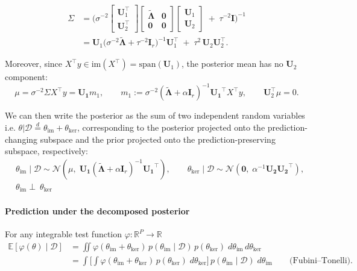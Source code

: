 \begin{align}
\Sigma
&=\Bigg(
\sigma^{-2}
\left[\begin{array}{c}
\mathbf{U}_1^{\top}\\ \hline \mathbf{U}_2^{\top}
\end{array}\right]
\left[\begin{array}{c|c}
\tilde{\mathbf{\Lambda}} & \mathbf{0}\\ \hline
\mathbf{0} & \mathbf{0}
\end{array}\right]
\left[\begin{array}{c}
\mathbf{U}_1\\ \hline \mathbf{U}_2
\end{array}\right]
\;+\;\tau^{-2}\mathbf{I}
\Bigg)^{-1} \nonumber\\
&=
\mathbf{U}_1\big(\sigma^{-2}\tilde{\mathbf{\Lambda}}+\tau^{-2}\mathbf{I}_r\big)^{-1}\mathbf{U}_1^{\top}
\;+\;
\tau^{2}\,\mathbf{U}_2\mathbf{U}_2^{\top}.
\end{align}



Moreover, since $X^\top y\in\mathrm{im}(X^\top)=\mathrm{span}(\mathbf U_1)$, the posterior mean has no $\mathbf U_2$
component:
\[
\mu=\sigma^{-2}\Sigma X^\top y
=
\mathbf{U_1} m_1,
\qquad
m_1:=\sigma^{-2}(\tilde{\mathbf{\Lambda}}+\alpha \mathbf I_r)^{-1}\mathbf{U_1}^\top X^\top y,
\qquad
\mathbf U_2^\top \mu=0.
\]

We can then write the posterior as the sum of two independent random variables i.e. $\theta | \mathcal{D} \overset{d}{=} \theta_{\textrm{im}} + \theta_{\textrm{ker}}$, corresponding to the posterior projected onto the prediction-changing subspace and the prior projected onto the  prediction-preserving subspace, respectively: 
\begin{align}
    &\theta_{\textrm{im}}\mid\mathcal D\sim\mathcal{N}(\mu,\;\mathbf{U_1}(\tilde{\mathbf{\Lambda}}+\alpha \mathbf I_r)^{-1}\mathbf{U_1}^\top),
\qquad
\theta_{\textrm{ker}}\mid\mathcal D\sim\mathcal{N}(\mathbf{0},\;\alpha^{-1}\mathbf{U_2}\mathbf{U_2}^\top),
\\
&\theta_{\textrm{im}} \perp\ \theta_{\textrm{ker}}
\end{align}


\paragraph{Prediction under the decomposed posterior}
For any integrable test function $\varphi:\mathbb{R}^P\to\mathbb{R}$
\begin{align}
    \mathbb{E}[\varphi(\theta)\mid\mathcal D] 
    &= \iint \varphi(\theta_{\textrm{im}} + \theta_{\textrm{ker}})\,p(\theta_{\textrm{im}}\mid\mathcal D)\,
    p(\theta_{\textrm{ker}})\;d\theta_{\textrm{im}}\,d\theta_{\textrm{ker}} \\
    &= \int \Bigg[ \int \varphi(\theta_{\textrm{im}} + \theta_{\textrm{ker}})\,p(\theta_{\textrm{ker}})\;d\theta_{\textrm{ker}} \Bigg]\,
    p(\theta_{\textrm{im}}\mid\mathcal D)\;d\theta_{\textrm{im}}
    \qquad \text{(Fubini--Tonelli)}.
\end{align}

